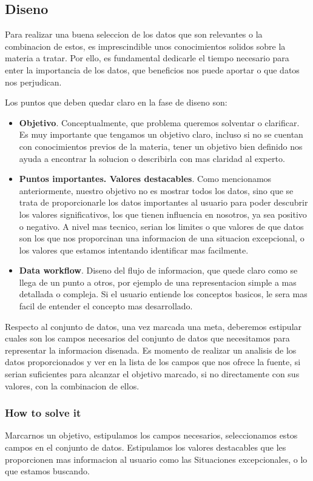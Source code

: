 \subsection{Diseno}
Para realizar una buena seleccion de los datos que son relevantes o la combinacion de estos, es imprescindible unos 
conocimientos solidos sobre la materia a tratar. Por ello, es fundamental dedicarle el tiempo necesario para enter la
importancia de los datos, que beneficios nos puede aportar o que datos nos perjudican.

Los puntos que deben quedar claro en la fase de diseno son:

\begin{itemize}
    \item \textbf{Objetivo}. Conceptualmente, que problema queremos solventar o clarificar. Es muy importante que tengamos un objetivo claro,
    incluso si no se cuentan con conocimientos previos de la materia, tener un objetivo bien definido nos ayuda a encontrar la solucion o 
    describirla con mas claridad al experto.
    \item \textbf{Puntos importantes. Valores destacables}. Como mencionamos anteriormente, nuestro objetivo no es mostrar todos los datos, sino
    que se trata de proporcionarle los datos importantes al usuario para poder descubrir los valores significativos, los que tienen influencia en
    nosotros, ya sea positivo o negativo. A nivel mas tecnico, serian los limites o que valores de que datos son los que nos proporcinan una informacion
    de una situacion excepcional, o los valores que estamos intentando identificar mas facilmente.
    \item \textbf{Data workflow}. Diseno del flujo de informacion, que quede claro como se llega de un punto a otros, por ejemplo de una representacion
    simple a mas detallada o compleja. Si el usuario entiende los conceptos basicos, le sera mas facil de entender el concepto mas desarrollado.
\end{itemize}

Respecto al conjunto de datos, una vez marcada una meta, deberemos estipular cuales son los campos necesarios del conjunto de datos que necesitamos para representar la informacion
disenada. Es momento de realizar un analisis de los datos proporcionados y ver en la lista de los campos que nos ofrece la fuente, si serian
suficientes para alcanzar el objetivo marcado, si no directamente con sus valores, con la combinacion de ellos.

\subsubsection{How to solve it} 
Marcarnos un objetivo, estipulamos los campos necesarios, seleccionamos estos campos en el conjunto de datos. 
Estipulamos los valores destacables que les proporcionen mas informacion al usuario como las Situaciones excepcionales, o lo que estamos buscando.

